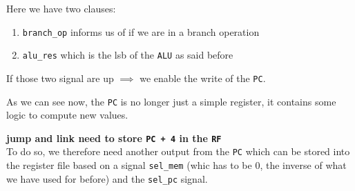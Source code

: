 	Here we have two clauses:
	\begin{enumerate}
	    \item \texttt{branch\_op} \textrightarrow informs us of if we are in a branch operation 
	    \item \texttt{alu\_res} which is the lsb of the \texttt{ALU} as said before
	\end{enumerate}
	If those two signal are up $\implies$ we enable the write of the \texttt{PC}.
    \begin{framedremark}
    As we can see now, the \texttt{PC} is no longer just a simple register, it contains some logic to compute new values.
    \end{framedremark}
\textbf{jump and link need to store \texttt{PC + 4} in the \texttt{RF}}\\
    To do so, we therefore need another output from the \texttt{PC} which can be stored into the register file based on a signal \texttt{sel\_mem} (whic has to be 0, the inverse of what we have used for before) and the \texttt{sel\_pc} signal.\\
